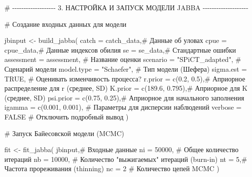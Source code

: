 \documentclass[
  letterpaper,
  DIV=11,
  numbers=noendperiod]{scrreprt}
\newenvironment{Shaded}{\begin{snugshade}}{\end{snugshade}}
\newcommand{\AttributeTok}[1]{\textcolor[rgb]{0.40,0.45,0.13}{#1}}
\newcommand{\CommentTok}[1]{\textcolor[rgb]{0.37,0.37,0.37}{#1}}
\newcommand{\ConstantTok}[1]{\textcolor[rgb]{0.56,0.35,0.01}{#1}}
\newcommand{\DecValTok}[1]{\textcolor[rgb]{0.68,0.00,0.00}{#1}}
\newcommand{\FloatTok}[1]{\textcolor[rgb]{0.68,0.00,0.00}{#1}}
\newcommand{\FunctionTok}[1]{\textcolor[rgb]{0.28,0.35,0.67}{#1}}
\newcommand{\NormalTok}[1]{\textcolor[rgb]{0.00,0.23,0.31}{#1}}
\newcommand{\OtherTok}[1]{\textcolor[rgb]{0.00,0.23,0.31}{#1}}
\newcommand{\StringTok}[1]{\textcolor[rgb]{0.13,0.47,0.30}{#1}}
\begin{document}
\begin{Shaded}
\begin{Highlighting}[]
\CommentTok{\# {-}{-}{-}{-}{-}{-}{-}{-}{-}{-}{-}{-}{-}{-}{-}{-}{-}{-}{-} 3. НАСТРОЙКА И ЗАПУСК МОДЕЛИ JABBA {-}{-}{-}{-}{-}{-}{-}{-}{-}{-}{-}{-}{-}{-}{-}{-}{-}{-}{-}{-}}


\CommentTok{\# Создание входных данных для модели}

\NormalTok{jbinput }\OtherTok{\textless{}{-}} \FunctionTok{build\_jabba}\NormalTok{(}
\AttributeTok{catch =}\NormalTok{ catch\_data,}\CommentTok{\# Данные об уловах}
\AttributeTok{cpue =}\NormalTok{ cpue\_data,}\CommentTok{\# Данные индексов обилия}
\AttributeTok{se =}\NormalTok{ se\_data,}\CommentTok{\# Стандартные ошибки}
\AttributeTok{assessment =}\NormalTok{ assessment, }\CommentTok{\# Название оценки}
\AttributeTok{scenario =} \StringTok{"SPiCT\_adapted"}\NormalTok{, }\CommentTok{\# Сценарий модели}
\AttributeTok{model.type =} \StringTok{"Schaefer"}\NormalTok{, }\CommentTok{\# Тип модели (Шефера)}
\AttributeTok{sigma.est =} \ConstantTok{TRUE}\NormalTok{, }\CommentTok{\# Оценивать изменчивость процесса?}
\AttributeTok{r.prior =} \FunctionTok{c}\NormalTok{(}\FloatTok{0.2}\NormalTok{, }\FloatTok{0.5}\NormalTok{),}\CommentTok{\# Априорное распределение для r (среднее, SD)}
\AttributeTok{K.prior =} \FunctionTok{c}\NormalTok{(}\FloatTok{189.6}\NormalTok{, }\FloatTok{0.795}\NormalTok{),}\CommentTok{\# Априорное для K (среднее, SD)}
\AttributeTok{psi.prior =} \FunctionTok{c}\NormalTok{(}\FloatTok{0.75}\NormalTok{, }\FloatTok{0.25}\NormalTok{),}\CommentTok{\# Априорное для начального заполнения}
\AttributeTok{igamma =} \FunctionTok{c}\NormalTok{(}\FloatTok{0.001}\NormalTok{, }\FloatTok{0.001}\NormalTok{), }\CommentTok{\# Параметры для дисперсии наблюдений}
\AttributeTok{verbose =} \ConstantTok{FALSE} \CommentTok{\# Отключить подробный вывод}
\NormalTok{)}

\CommentTok{\# Запуск Байесовской модели (MCMC)}

\NormalTok{fit }\OtherTok{\textless{}{-}} \FunctionTok{fit\_jabba}\NormalTok{(}
\NormalTok{jbinput,}\CommentTok{\# Входные данные}
\AttributeTok{ni =} \DecValTok{50000}\NormalTok{, }\CommentTok{\# Общее количество итераций}
\AttributeTok{nb =} \DecValTok{10000}\NormalTok{, }\CommentTok{\# Количество "выжигаемых" итераций (burn{-}in)}
\AttributeTok{nt =} \DecValTok{5}\NormalTok{,}\CommentTok{\# Частота прореживания (thinning)}
\AttributeTok{nc =} \DecValTok{2} \CommentTok{\# Количество цепей MCMC}
\NormalTok{)}
\end{Highlighting}
\end{Shaded}
\end{document}
